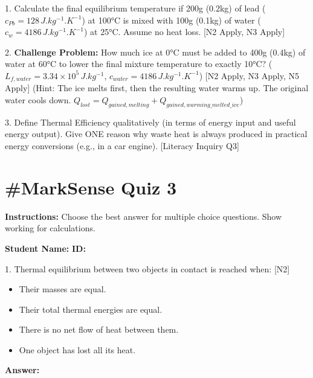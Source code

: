 \documentclass[11pt, a4paper]{article}
\begin{document}
1.  Calculate the final equilibrium temperature if 200g (0.2kg) of lead ($c_{Pb} = 128 \, \si{J.kg^{-1}.K^{-1}}$) at 100\si{\celsius} is mixed with 100g (0.1kg) of water ($c_{w} = 4186 \, \si{J.kg^{-1}.K^{-1}}$) at 25\si{\celsius}. Assume no heat loss. [N2 Apply, N3 Apply]
    \vspace{4cm}

2.  \textbf{Challenge Problem:} How much ice at 0\si{\celsius} must be added to 400g (0.4kg) of water at 60\si{\celsius} to lower the final mixture temperature to exactly 10\si{\celsius}? ($L_{f, water} = 3.34 \times 10^5 \, \si{J.kg^{-1}}$, $c_{water} = 4186 \, \si{J.kg^{-1}.K^{-1}}$) [N2 Apply, N3 Apply, N5 Apply]
    (Hint: The ice melts first, then the resulting water warms up. The original water cools down. $Q_{lost} = Q_{gained, melting} + Q_{gained, warming\_melted\_ice}$)
    \vspace{6cm}

3.  Define Thermal Efficiency qualitatively (in terms of energy input and useful energy output). Give ONE reason why waste heat is always produced in practical energy conversions (e.g., in a car engine). [Literacy Inquiry Q3]
    \vspace{3cm}


\hrulefill
\section*{\#MarkSense Quiz 3}
\textbf{Instructions:} Choose the best answer for multiple choice questions. Show working for calculations.

\vspace{0.5cm}
\textbf{Student Name:} \underline{\hspace{5cm}} \textbf{ID:} \underline{\hspace{3cm}}
\vspace{0.5cm}

1.  Thermal equilibrium between two objects in contact is reached when: [N2]
    \begin{itemize}
        \item[A.] Their masses are equal.
        \item[B.] Their total thermal energies are equal.
        \item[C.] There is no net flow of heat between them.
        \item[D.] One object has lost all its heat.
    \end{itemize}
    \textbf{Answer:} \underline{\hspace{1cm}}
\end{document}
